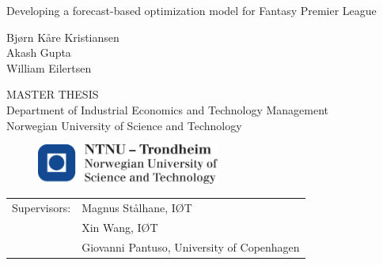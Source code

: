 \vspace*{7cm}


\begin{center}{\vspace{-7cm}}
{\Huge Developing a forecast-based optimization model for Fantasy Premier League}
\end{center}
\vspace*{7cm}

\begin{center}{\vspace{-4cm}}
{\Large Bj\o rn K\aa re Kristiansen} \\ 
{\Large Akash Gupta} \\
{\Large William Eilertsen}
\end{center}

\begin{center}{\vspace{2cm}}
   MASTER THESIS \\ 
   Department of Industrial Economics and Technology Management\\
Norwegian University of Science and Technology
\end{center}

\begin{figure}[H]{\vspace{0.5cm}}
    \centering
    \includegraphics[width = 60mm,scale=0.5]{fig/ntnu_logo.png}
\end{figure}


\begin{table}[b]
    \begin{tabular}{ll}
       Supervisors:  & Magnus St\aa lhane, I\O T \\ 
                     & Xin Wang, I\O T \\
                     & Giovanni Pantuso, University of Copenhagen \\ 
    \end{tabular}
\end{table}

\cleardoublepage
